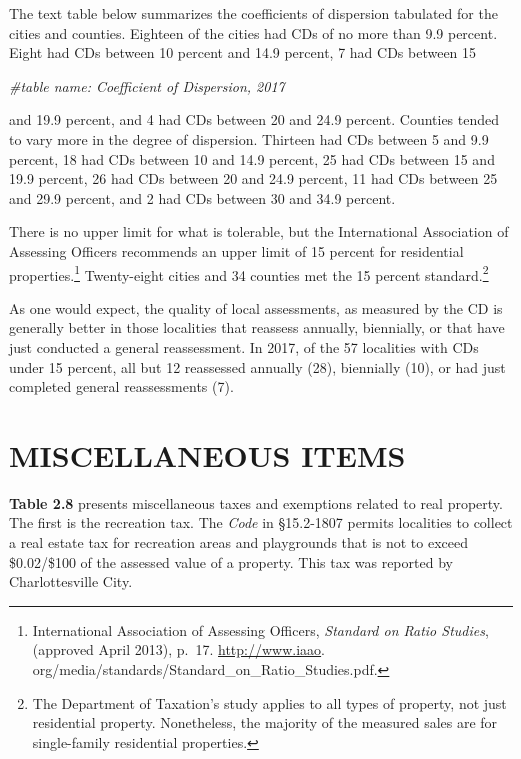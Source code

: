 \documentclass[
]{book}
\newenvironment{Shaded}{\begin{snugshade}}{\end{snugshade}}
\newcommand{\CommentTok}[1]{\textcolor[rgb]{0.56,0.35,0.01}{\textit{#1}}}
\begin{document}
The text table below summarizes the coefficients of dispersion tabulated for the cities and counties. Eighteen of the cities had CDs of no more than 9.9 percent. Eight had CDs between 10 percent and 14.9 percent, 7 had CDs between 15

\begin{Shaded}
\begin{Highlighting}[]
\CommentTok{\#table name: Coefficient of Dispersion, 2017}
\end{Highlighting}
\end{Shaded}

and 19.9 percent, and 4 had CDs between 20 and 24.9 percent. Counties tended to vary more in the degree of dispersion. Thirteen had CDs between 5 and 9.9 percent, 18 had CDs between 10 and 14.9 percent, 25 had CDs between 15 and 19.9 percent, 26 had CDs between 20 and 24.9 percent, 11 had CDs between 25 and 29.9 percent, and 2 had CDs between 30 and 34.9 percent.

There is no upper limit for what is tolerable, but the International Association of Assessing Officers recommends an upper limit of 15 percent for residential properties.\footnote{International Association of Assessing Officers, \emph{Standard on Ratio Studies}, (approved April 2013), p.~17. \url{http://www.iaao}.
  org/media/standards/Standard\_on\_Ratio\_Studies.pdf.} Twenty-eight cities and 34 counties met the 15 percent standard.\footnote{The Department of Taxation's study applies to all types of property, not just residential property. Nonetheless, the majority of
  the measured sales are for single-family residential properties.}

As one would expect, the quality of local assessments, as measured by the CD is generally better in those localities that reassess annually, biennially, or that have just conducted a general reassessment. In 2017, of the 57 localities with CDs under 15 percent, all but 12 reassessed annually (28), biennially (10), or had just completed general reassessments (7).

\hypertarget{miscellaneous-items}{%
\section{MISCELLANEOUS ITEMS}\label{miscellaneous-items}}

\textbf{Table 2.8} presents miscellaneous taxes and exemptions related to real property. The first is the recreation tax. The \emph{Code} in §15.2-1807 permits localities to collect a real estate tax for recreation areas and playgrounds that is not to exceed \$0.02/\$100 of the assessed value of a property. This tax was reported by Charlottesville City.
\end{document}
